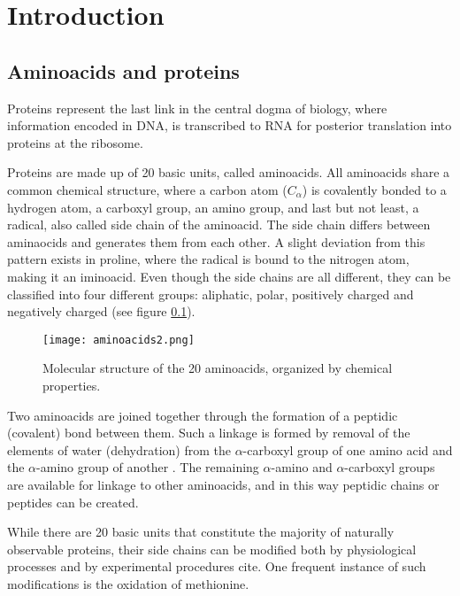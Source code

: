 \chapter*{Introduction}
\label{chap:introduction}

\section{Aminoacids and proteins}

Proteins represent the last link in the central dogma of biology, where information encoded in DNA, is transcribed to RNA for posterior translation into proteins at the ribosome.

Proteins are made up of 20 basic units, called aminoacids. All aminoacids share a common chemical structure, where a carbon atom ($C_\alpha$) is covalently bonded to a hydrogen atom, a carboxyl group, an amino group, and last but not least, a radical, also called side chain of the aminoacid. The side chain differs between aminaocids and generates them from each other. A slight deviation from this pattern exists in proline, where the radical is bound to the nitrogen atom, making it an iminoacid. Even though the side chains are all different, they can be classified into four different groups: aliphatic, polar, positively charged and negatively charged (see figure \ref{fig:aminoacids}).

    
\begin{figure}
  \centering
  \texttt{[image: aminoacids2.png]}
  \caption[The 20 aminoacids]{Molecular structure of the 20 aminoacids, organized by chemical properties.}
  \label{fig:aminoacids}
\end{figure}

Two aminoacids are joined together through the formation of a peptidic (covalent) bond between them. Such a linkage is formed by removal of the elements of water (dehydration) from the $\alpha$-carboxyl group of one amino acid and the $\alpha$-amino group of another \cite{Nelson2008}. The remaining $\alpha$-amino and $\alpha$-carboxyl groups are available for linkage to other aminoacids, and in this way peptidic chains or peptides can be created.

While there are 20 basic units that constitute the majority of naturally observable proteins, their side chains can be modified both by physiological processes and by experimental procedures cite. One frequent instance of such modifications is the oxidation of methionine.


